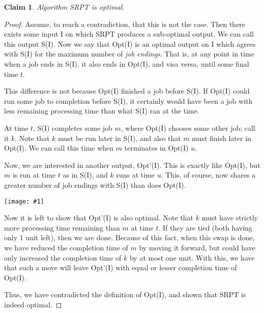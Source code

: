 \documentclass{article}
\newtheorem{thm}{Claim}
\providecommand{\image}[1]{
    \begin{center}
        \texttt{[image: \#1]}
    \end{center}
}
\begin{document}
    \begin{thm}
        Algorithm SRPT is optimal.
    \end{thm}
    \begin{proof}
        Assume, to reach a contradiction, that this is not the case.
        Then there exists some input I on which SRPT produces a sub-optimal output.
        We can call this output S(I).
        Now we say that Opt(I) is an optimal output on I which agrees with S(I) for the maximum number of \emph{job endings}.
        That is, at any point in time when a job ends in S(I), it also ends in Opt(I), and visa versa, until some final time $t$.
        
        This difference is not because Opt(I) finished a job before S(I).
        If Opt(I) could run some job to completion before S(I), it certainly would have been a job with less remaining processing time than what S(I) ran at the time.
        
        At time $t$, S(I) completes some job $m$, where Opt(I) chooses some other job; call it $k$.
        Note that $k$ must be run later in S(I), and also that $m$ must finish later in Opt(I).
        We can call this time when $m$ terminates in Opt(I) $u$.
        
        Now, we are interested in another output, Opt'(I). 
        This is exactly like Opt(I), but $m$ is run at time $t$ as in S(I), and $k$ runs at time $u$.
        This, of course, now shares a greater number of job endings with S(I) than does Opt(I).
        
        \image{p10btable}
        
        Now it is left to show that Opt'(I) is also optimal.
        Note that $k$ must have strictly more processing time remaining than $m$ at time $t$.
        If they are tied (both having only 1 unit left), then we are done.
        Because of this fact, when this swap is done, we have reduced the completion time of $m$ by moving it forward, but could have only increased the completion time of $k$ by at most one unit.
        With this, we have that such a move will leave Opt'(I) with equal or lesser completion time of Opt(I).
        
        Thus, we have contradicted the definition of Opt(I), and shown that SRPT is indeed optimal.
    \end{proof}
\end{document}
